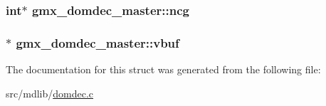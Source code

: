 \hypertarget{structgmx__domdec__master_ab1c0bdde74cee459312d4c3fb7dcf530}{
\subsubsection[{ncg}]{\setlength{\rightskip}{0pt plus 5cm}int$\ast$ {\bf gmx\-\_\-domdec\-\_\-master\-::ncg}}}\label{structgmx__domdec__master_ab1c0bdde74cee459312d4c3fb7dcf530}
\hypertarget{structgmx__domdec__master_adf2d658e351ccdd7a8b9b83be347c088}{
\subsubsection[{vbuf}]{$\ast$ {\bf gmx\-\_\-domdec\-\_\-master\-::vbuf}}}\label{structgmx__domdec__master_adf2d658e351ccdd7a8b9b83be347c088}


\-The documentation for this struct was generated from the following file\-:\begin{DoxyCompactItemize}
\item 
src/mdlib/\hyperlink{domdec_8c}{domdec.\-c}\end{DoxyCompactItemize}
